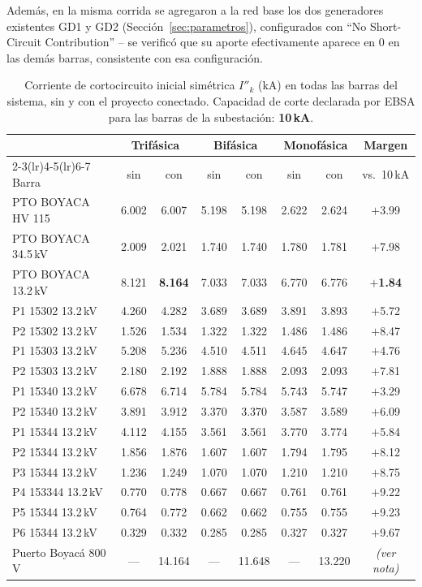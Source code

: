 \documentclass[11pt,a4paper]{article}
\begin{document}
Adem\'as, en la misma corrida se agregaron a la red base los dos generadores existentes GD1 y GD2 (Secci\'on~\ref{sec:parametros}), configurados con ``No Short-Circuit Contribution'' -- se verific\'o que su aporte efectivamente aparece en 0 en las dem\'as barras, consistente con esa configuraci\'on.

\begin{table}[H]
\centering
\caption{Corriente de cortocircuito inicial sim\'etrica $I''_{k}$ (kA) en todas las barras del sistema, sin y con el proyecto conectado. Capacidad de corte declarada por EBSA para las barras de la subestaci\'on: \textbf{10\,kA}.}
\small
\begin{tabular}{lcccccc c}
\toprule
& \multicolumn{2}{c}{Trif\'asica} & \multicolumn{2}{c}{Bif\'asica} & \multicolumn{2}{c}{Monof\'asica} & Margen \\
\cmidrule(lr){2-3}\cmidrule(lr){4-5}\cmidrule(lr){6-7}
Barra & sin & con & sin & con & sin & con & vs.\ 10\,kA \\
\midrule
PTO BOYACA HV 115 & 6.002 & 6.007 & 5.198 & 5.198 & 2.622 & 2.624 & $+$3.99 \\
PTO BOYACA 34.5\,kV & 2.009 & 2.021 & 1.740 & 1.740 & 1.780 & 1.781 & $+$7.98 \\
PTO BOYACA 13.2\,kV & 8.121 & \textbf{8.164} & 7.033 & 7.033 & 6.770 & 6.776 & \textbf{$+$1.84} \\
\midrule
P1 15302 13.2\,kV & 4.260 & 4.282 & 3.689 & 3.689 & 3.891 & 3.893 & $+$5.72 \\
P2 15302 13.2\,kV & 1.526 & 1.534 & 1.322 & 1.322 & 1.486 & 1.486 & $+$8.47 \\
P1 15303 13.2\,kV & 5.208 & 5.236 & 4.510 & 4.511 & 4.645 & 4.647 & $+$4.76 \\
P2 15303 13.2\,kV & 2.180 & 2.192 & 1.888 & 1.888 & 2.093 & 2.093 & $+$7.81 \\
P1 15340 13.2\,kV & 6.678 & 6.714 & 5.784 & 5.784 & 5.743 & 5.747 & $+$3.29 \\
P2 15340 13.2\,kV & 3.891 & 3.912 & 3.370 & 3.370 & 3.587 & 3.589 & $+$6.09 \\
\midrule
P1 15344 13.2\,kV & 4.112 & 4.155 & 3.561 & 3.561 & 3.770 & 3.774 & $+$5.84 \\
P2 15344 13.2\,kV & 1.856 & 1.876 & 1.607 & 1.607 & 1.794 & 1.795 & $+$8.12 \\
P3 15344 13.2\,kV & 1.236 & 1.249 & 1.070 & 1.070 & 1.210 & 1.210 & $+$8.75 \\
P4 153344 13.2\,kV & 0.770 & 0.778 & 0.667 & 0.667 & 0.761 & 0.761 & $+$9.22 \\
P5 15344 13.2\,kV & 0.764 & 0.772 & 0.662 & 0.662 & 0.755 & 0.755 & $+$9.23 \\
P6 15344 13.2\,kV & 0.329 & 0.332 & 0.285 & 0.285 & 0.327 & 0.327 & $+$9.67 \\
\midrule
Puerto Boyac\'a 800\,V & --- & 14.164 & --- & 11.648 & --- & 13.220 & \emph{(ver nota)} \\
\bottomrule
\end{tabular}
\end{table}
\end{document}
